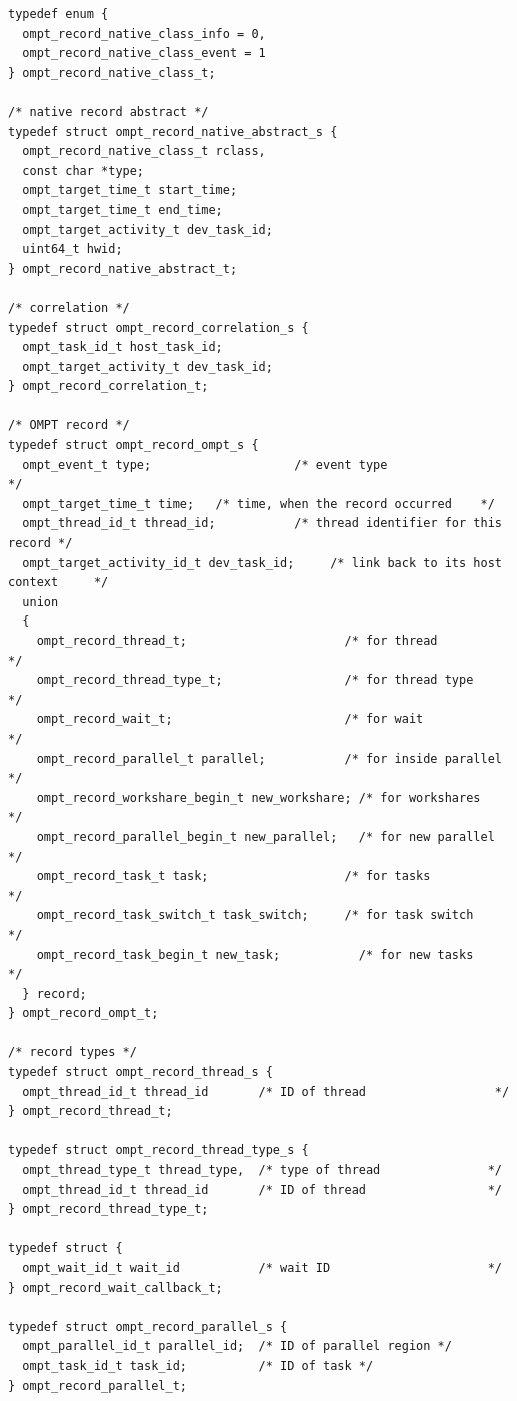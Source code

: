 \documentclass{article}
\begin{document}
{\begin{verbatim}
typedef enum {
  ompt_record_native_class_info = 0,
  ompt_record_native_class_event = 1
} ompt_record_native_class_t;

/* native record abstract */
typedef struct ompt_record_native_abstract_s {
  ompt_record_native_class_t rclass,
  const char *type;
  ompt_target_time_t start_time;
  ompt_target_time_t end_time;
  ompt_target_activity_t dev_task_id;
  uint64_t hwid;
} ompt_record_native_abstract_t;

/* correlation */
typedef struct ompt_record_correlation_s {
  ompt_task_id_t host_task_id;         
  ompt_target_activity_t dev_task_id;
} ompt_record_correlation_t;

/* OMPT record */
typedef struct ompt_record_ompt_s {
  ompt_event_t type;                    /* event type                        */
  ompt_target_time_t time;   /* time, when the record occurred    */
  ompt_thread_id_t thread_id;           /* thread identifier for this record */
  ompt_target_activity_id_t dev_task_id;     /* link back to its host context     */
  union
  {
    ompt_record_thread_t;                      /* for thread          */
    ompt_record_thread_type_t;                 /* for thread type     */
    ompt_record_wait_t;                        /* for wait            */
    ompt_record_parallel_t parallel;           /* for inside parallel */
    ompt_record_workshare_begin_t new_workshare; /* for workshares      */
    ompt_record_parallel_begin_t new_parallel;   /* for new parallel    */
    ompt_record_task_t task;                   /* for tasks           */
    ompt_record_task_switch_t task_switch;     /* for task switch     */
    ompt_record_task_begin_t new_task;           /* for new tasks       */
  } record;
} ompt_record_ompt_t;

/* record types */
typedef struct ompt_record_thread_s {
  ompt_thread_id_t thread_id       /* ID of thread                  */
} ompt_record_thread_t;

typedef struct ompt_record_thread_type_s {
  ompt_thread_type_t thread_type,  /* type of thread               */
  ompt_thread_id_t thread_id       /* ID of thread                 */
} ompt_record_thread_type_t;

typedef struct {
  ompt_wait_id_t wait_id           /* wait ID                      */
} ompt_record_wait_callback_t;

typedef struct ompt_record_parallel_s {
  ompt_parallel_id_t parallel_id;  /* ID of parallel region */
  ompt_task_id_t task_id;          /* ID of task */
} ompt_record_parallel_t;


\end{verbatim}}
\end{document}
